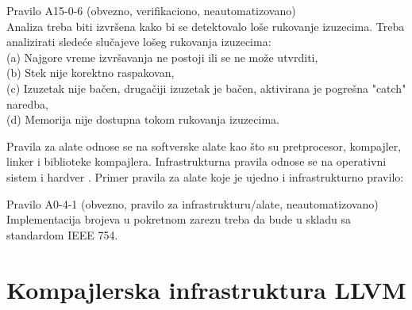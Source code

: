 \documentclass[12pt,oneside]{memoir}
\begin{document}
\begin{center}
\begin{tcolorbox}
Pravilo A15-0-6 (obvezno, verifikaciono, neautomatizovano) \\
Analiza treba biti izvršena kako bi se detektovalo loše rukovanje izuzecima. Treba analizirati slede\'ce slučajeve lošeg rukovanja izuzecima: \\
(a) Najgore vreme izvršavanja ne postoji ili se ne može utvrditi, \\
(b) Stek nije korektno raspakovan, \\
(c) Izuzetak nije bačen, drugačiji izuzetak je bačen, aktivirana je pogre\v{s}na "catch" naredba, \\
(d) Memorija nije dostupna tokom rukovanja izuzecima.
\end{tcolorbox}
\end{center}

Pravila za alate odnose se na softverske alate kao što su pretprocesor, kompajler, linker i biblioteke kompajlera.
Infrastrukturna pravila odnose se na operativni sistem i hardver \cite{AutosarGuidelines}.
Primer pravila za alate koje je ujedno i infrastrukturno pravilo:

\begin{center}
\begin{tcolorbox}
Pravilo A0-4-1 (obvezno, pravilo za infrastrukturu/alate, neautomatizovano) \\
Implementacija brojeva u pokretnom zarezu treba da bude u skladu sa standardom IEEE 754.
\end{tcolorbox}
\end{center}


\chapter{Kompajlerska infrastruktura LLVM}
\label{chp:llvm}
\end{document}
